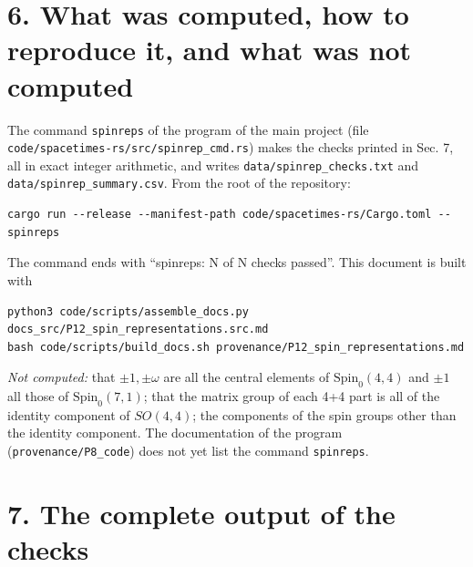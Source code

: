 \documentclass[
  10pt,
]{article}
\begin{document}
\hypertarget{what-was-computed-how-to-reproduce-it-and-what-was-not-computed}{%
\section{6. What was computed, how to reproduce it, and what was not
computed}\label{what-was-computed-how-to-reproduce-it-and-what-was-not-computed}}

The command \texttt{spinreps} of the program of the main project (file
\texttt{code/spacetimes-rs/src/spinrep\_cmd.rs}) makes the checks
printed in Sec. 7, all in exact integer arithmetic, and writes
\texttt{data/spinrep\_checks.txt} and
\texttt{data/spinrep\_summary.csv}. From the root of the repository:

\begin{verbatim}
cargo run --release --manifest-path code/spacetimes-rs/Cargo.toml -- spinreps
\end{verbatim}

The command ends with ``spinreps: N of N checks passed''. This document
is built with

\begin{verbatim}
python3 code/scripts/assemble_docs.py docs_src/P12_spin_representations.src.md
bash code/scripts/build_docs.sh provenance/P12_spin_representations.md
\end{verbatim}

\emph{Not computed:} that \(\pm1,\pm\omega\) are all the central
elements of \(\mathrm{Spin}_0(4,4)\) and \(\pm1\) all those of
\(\mathrm{Spin}_0(7,1)\); that the matrix group of each 4+4 part is all
of the identity component of \(SO(4,4)\); the components of the spin
groups other than the identity component. The documentation of the
program (\texttt{provenance/P8\_code}) does not yet list the command
\texttt{spinreps}.

\hypertarget{the-complete-output-of-the-checks}{%
\section{7. The complete output of the
checks}\label{the-complete-output-of-the-checks}}
\end{document}
